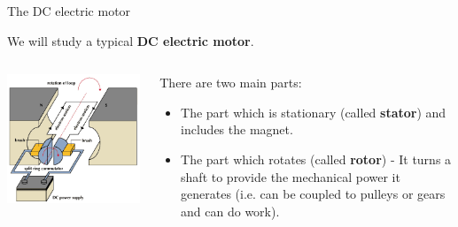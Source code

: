 %
%
%

\begin{frame}{The DC electric motor}

We will study a typical {\bf DC electric motor}.\\
\vspace{0.2cm}

\begin{columns}[t]
  \begin{column}{0.50\textwidth}
    \begin{center}
     \includegraphics[width=0.99\textwidth]{./images/schematics/electric_motor_dc_01.png}\\
    \end{center}
  \end{column}
  \begin{column}{0.50\textwidth}
    {\small
    There are two main parts:
    \begin{itemize}
      \item The part which is stationary (called {\bf stator}) and includes the magnet.
      \item The part which rotates (called {\bf rotor}) -
                It turns a shaft to provide the mechanical power it generates (i.e. can be coupled to pulleys or gears and can do work).
    \end{itemize}
    }
    \begin{center}

\end{center}
\end{column}
\end{columns}
\end{frame}
